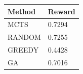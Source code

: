 \begin{tabular}{ll}
\hline
Method & Reward \\
\hline
  MCTS & 0.7294 \\
  RANDOM & 0.7255 \\
  GREEDY & 0.4428 \\
  GA & 0.7016 \\
\hline
\end{tabular}
